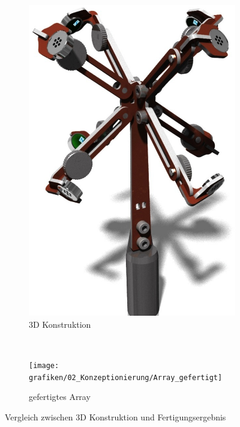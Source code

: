 \begin{figure}
        \centering
        \begin{subfigure}[b]{0.4\textwidth}
                \centering
                \includegraphics[width=\textwidth]{grafiken/02_Konzeptionierung/3D_Konstruktion_Array_ohne_Kanten}
                \caption{3D Konstruktion}
                \label{fig:3D_Konstruktion_Array_ohne_Kanten}
        \end{subfigure}
        ~ %
        \begin{subfigure}[b]{0.47\textwidth}
                \centering
                \texttt{[image: grafiken/02\_Konzeptionierung/Array\_gefertigt]}
                \caption{gefertigtes Array}
                \label{fig:Array_gefertigt}
        \end{subfigure}
        \caption{Vergleich zwischen 3D Konstruktion und Fertigungsergebnis}
        \label{fig:Vergleich_array_gefertigt}
\end{figure}










